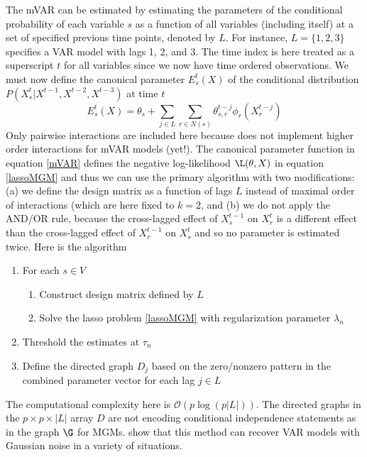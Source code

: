 The mVAR can be estimated by estimating the parameters of the conditional probability of each variable $s$ as a function of all variables (including itself) at a set of specified previous time points, denoted by $L$. For instance, $L=\{1,2,3\}$ specifies a VAR model with lags 1, 2, and 3. The time index is here treated as a superscript $t$ for all variables since we now have time ordered observations. We must now define the canonical parameter $E_{s}^{t}(X)$ of the conditional distribution $P(X_{s}^{t}|X^{t-1},X^{t-2},X^{t-3})$ at time $t$
\begin{equation} \label{mVAR}
    E_{s}^{t}(X) = \theta_s + \sum_{j \in L} \sum_{r \in N(s)} \theta_{s,r}^{t-j} \phi_r (X_{r}^{t-j})
\end{equation}
Only pairwise interactions are included here because  does not implement higher order interactions for mVAR models (yet!). The canonical parameter function in equation \ref{mVAR} defines the negative log-likelihood $\L(\theta,X)$ in equation \ref{lassoMGM} and thus we can use the primary algorithm with two modifications: (a) we define the design matrix as a function of lags $L$ instead of maximal order of interactions (which are here fixed to $k=2$, and (b) we do not apply the AND/OR rule, because the cross-lagged effect of $X_{s}^{t-1}$ on $X_{r}^{t}$ is a different effect than the cross-lagged effect of $X_{r}^{t-1}$ on $X_{s}^{t}$ and so no parameter is estimated twice. Here is the algorithm
\begin{enumerate}
    \item For each $s \in V$
    \begin{enumerate}
        \item Construct design matrix defined by $L$
        \item Solve the lasso problem \eqref{lassoMGM} with regularization parameter $\lambda_n$
    \end{enumerate}
    \item Threshold the estimates at $\tau_n$
    \item Define the directed graph $D_j$ based on the zero/nonzero pattern in the combined parameter vector for each lag $j \in L$
\end{enumerate}
The computational complexity here is $\mathcal{O}(p\log(p|L|))$. The directed graphs in the $p \times p \times |L|$ array $D$ are not encoding conditional independence statements as in the graph $\G$ for MGMs. \cite{haslbeck2017estimate} show that this method can recover VAR models with Gaussian noise in a variety of situations.

